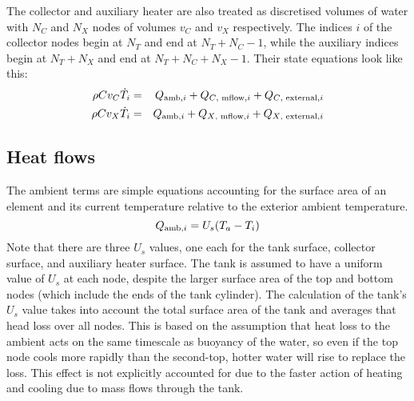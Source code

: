 The collector and auxiliary heater are also treated as discretised volumes of water with $N_C$ and $N_X$ nodes of volumes $v_C$ and $v_X$ respectively.
The indices $i$ of the collector nodes begin at $N_T$ and end at $N_T+N_C-1$, while the auxiliary indices begin at $N_T+N_X$ and end at $N_T+N_C+N_X-1$.
Their state equations look like this:
\begin{eqnarray}
   \label{eq:coll-node-dT}
   \rho C v_C \dot{T}_i &=& Q_{\text{amb}, i} + Q_{\text{$C$, mflow}, i} + Q_{\text{$C$, external}, i}
   \\
   \label{eq:aux-node-dT}
   \rho C v_X \dot{T}_i &=& Q_{\text{amb}, i} + Q_{\text{$X$, mflow}, i} + Q_{\text{$X$, external}, i}
\end{eqnarray}

\subsection{Heat flows}

The ambient terms are simple equations accounting for the surface area of an element and its current temperature relative to the exterior ambient temperature.
\begin{equation}
   \label{eq:Q-amb}
   Q_{\text{amb}, i} = U_s (T_a - T_i)
\end{equation}
Note that there are three $U_s$ values, one each for the tank surface, collector surface, and auxiliary heater surface.
The tank is assumed to have a uniform value of $U_s$ at each node, despite the larger surface area of the top and bottom nodes (which include the ends of the tank cylinder).
The calculation of the tank's $U_s$ value takes into account the total surface area of the tank and averages that head loss over all nodes.
This is based on the assumption that heat loss to the ambient acts on the same timescale as buoyancy of the water, so even if the top node cools more rapidly than the second-top, hotter water will rise to replace the loss.
This effect is not explicitly accounted for due to the faster action of heating and cooling due to mass flows through the tank.

